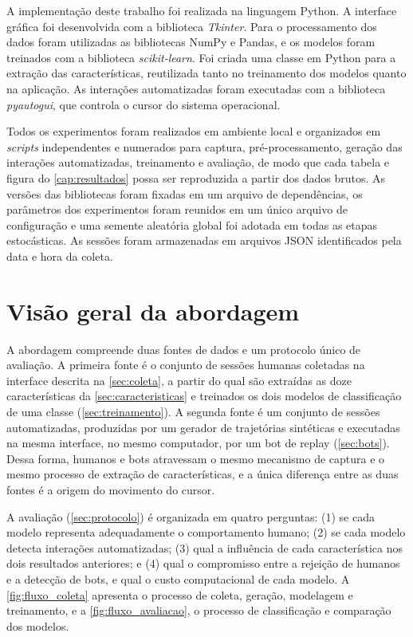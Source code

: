 A implementação deste trabalho foi realizada na linguagem Python. A interface gráfica foi desenvolvida com a biblioteca \textit{Tkinter}. Para o processamento dos dados foram utilizadas as bibliotecas NumPy e Pandas, e os modelos foram treinados com a biblioteca \textit{scikit-learn}. Foi criada uma classe em Python para a extração das características, reutilizada tanto no treinamento dos modelos quanto na aplicação. As interações automatizadas foram executadas com a biblioteca \textit{pyautogui}, que controla o cursor do sistema operacional.

Todos os experimentos foram realizados em ambiente local e organizados em \textit{scripts} independentes e numerados para captura, pré-processamento, geração das interações automatizadas, treinamento e avaliação, de modo que cada tabela e figura do \autoref{cap:resultados} possa ser reproduzida a partir dos dados brutos. As versões das bibliotecas foram fixadas em um arquivo de dependências, os parâmetros dos experimentos foram reunidos em um único arquivo de configuração e uma semente aleatória global foi adotada em todas as etapas estocásticas. As sessões foram armazenadas em arquivos JSON identificados pela data e hora da coleta.

\section{Visão geral da abordagem}

A abordagem compreende duas fontes de dados e um protocolo único de avaliação. A primeira fonte é o conjunto de sessões humanas coletadas na interface descrita na \autoref{sec:coleta}, a partir do qual são extraídas as doze características da \autoref{sec:caracteristicas} e treinados os dois modelos de classificação de uma classe (\autoref{sec:treinamento}). A segunda fonte é um conjunto de sessões automatizadas, produzidas por um gerador de trajetórias sintéticas e executadas na mesma interface, no mesmo computador, por um bot de replay (\autoref{sec:bots}). Dessa forma, humanos e bots atravessam o mesmo mecanismo de captura e o mesmo processo de extração de características, e a única diferença entre as duas fontes é a origem do movimento do cursor.

A avaliação (\autoref{sec:protocolo}) é organizada em quatro perguntas: (1) se cada modelo representa adequadamente o comportamento humano; (2) se cada modelo detecta interações automatizadas; (3) qual a influência de cada característica nos dois resultados anteriores; e (4) qual o compromisso entre a rejeição de humanos e a detecção de bots, e qual o custo computacional de cada modelo. A \autoref{fig:fluxo_coleta} apresenta o processo de coleta, geração, modelagem e treinamento, e a \autoref{fig:fluxo_avaliacao}, o processo de classificação e comparação dos modelos.

